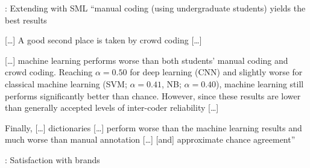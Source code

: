 \documentclass[handout]{beamer}
\begin{document}
\begin{frame}{\cite{VanAtteveldt2021}: Extending \cite{Boukes2020} with SML}
``manual coding (using undergraduate students) yields the
best results 

[\ldots] A good second place is taken by crowd coding [\ldots]  


[\ldots] machine learning performs worse than both students' manual coding and crowd coding.
Reaching $\alpha = 0.50$ for deep learning (CNN) and slightly worse for classical machine learning (SVM; $\alpha = 0.41$, NB; $\alpha = 0.40$), machine learning still performs significantly better than chance. However, since these results are lower than generally accepted levels of inter-coder reliability [\ldots]

Finally, [\ldots] dictionaries [\ldots] perform worse than the machine
learning results and much worse than manual annotation [\ldots] [and] approximate chance agreement''\end{frame}






\begin{frame}{\cite{Vermeer2019}: Satisfaction with brands}
\end{frame}
\end{document}
